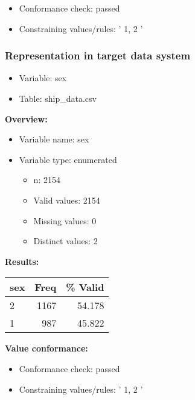 \documentclass[
]{article}
\providecommand{\tightlist}{%
  \setlength{\itemsep}{0pt}\setlength{\parskip}{0pt}}
\begin{document}
\begin{itemize}
\tightlist
\item
  Conformance check: passed
\item
  Constraining values/rules: ' 1, 2 '
\end{itemize}

\newpage

\hypertarget{representation-in-target-data-system-24}{%
\subsubsection{\texorpdfstring{Representation in \textbf{target} data
system}{Representation in target data system}}\label{representation-in-target-data-system-24}}

\begin{itemize}
\tightlist
\item
  Variable: sex
\item
  Table: ship\_data.csv
\end{itemize}

\textbf{Overview:}

\begin{itemize}
\tightlist
\item
  Variable name: sex
\item
  Variable type: enumerated

  \begin{itemize}
  \tightlist
  \item
    n: 2154
  \item
    Valid values: 2154
  \item
    Missing values: 0
  \item
    Distinct values: 2
  \end{itemize}
\end{itemize}

\textbf{Results:}\\

\begin{table}[H]
\centering
\begin{tabular}{l|r|r}
\hline
\textbf{sex} & \textbf{Freq} & \textbf{\% Valid}\\
\hline
2 & 1167 & 54.178\\
\hline
1 & 987 & 45.822\\
\hline
\end{tabular}
\end{table}

\textbf{Value conformance:}

\begin{itemize}
\tightlist
\item
  Conformance check: passed
\item
  Constraining values/rules: ' 1, 2 '
\end{itemize}
\end{document}
